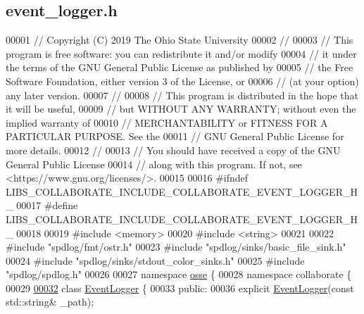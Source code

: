 \hypertarget{event__logger_8h_source}{}\subsection{event\+\_\+logger.\+h}
\label{event__logger_8h_source}

\begin{DoxyCode}
00001 \textcolor{comment}{// Copyright (C) 2019 The Ohio State University}
00002 \textcolor{comment}{//}
00003 \textcolor{comment}{// This program is free software: you can redistribute it and/or modify}
00004 \textcolor{comment}{// it under the terms of the GNU General Public License as published by}
00005 \textcolor{comment}{// the Free Software Foundation, either version 3 of the License, or}
00006 \textcolor{comment}{// (at your option) any later version.}
00007 \textcolor{comment}{//}
00008 \textcolor{comment}{// This program is distributed in the hope that it will be useful,}
00009 \textcolor{comment}{// but WITHOUT ANY WARRANTY; without even the implied warranty of}
00010 \textcolor{comment}{// MERCHANTABILITY or FITNESS FOR A PARTICULAR PURPOSE.  See the}
00011 \textcolor{comment}{// GNU General Public License for more details.}
00012 \textcolor{comment}{//}
00013 \textcolor{comment}{// You should have received a copy of the GNU General Public License}
00014 \textcolor{comment}{// along with this program.  If not, see <https://www.gnu.org/licenses/>.}
00015 
00016 \textcolor{preprocessor}{#ifndef LIBS\_COLLABORATE\_INCLUDE\_COLLABORATE\_EVENT\_LOGGER\_H\_}
00017 \textcolor{preprocessor}{#define LIBS\_COLLABORATE\_INCLUDE\_COLLABORATE\_EVENT\_LOGGER\_H\_}
00018 
00019 \textcolor{preprocessor}{#include <memory>}
00020 \textcolor{preprocessor}{#include <string>}
00021 
00022 \textcolor{preprocessor}{#include "spdlog/fmt/ostr.h"}
00023 \textcolor{preprocessor}{#include "spdlog/sinks/basic\_file\_sink.h"}
00024 \textcolor{preprocessor}{#include "spdlog/sinks/stdout\_color\_sinks.h"}
00025 \textcolor{preprocessor}{#include "spdlog/spdlog.h"}
00026 
00027 \textcolor{keyword}{namespace }\hyperlink{namespaceosse}{osse} \{
00028 \textcolor{keyword}{namespace }collaborate \{
00029 
\hyperlink{classosse_1_1collaborate_1_1_event_logger}{00032} \textcolor{keyword}{class }\hyperlink{classosse_1_1collaborate_1_1_event_logger}{EventLogger} \{
00033  \textcolor{keyword}{public}:
00036   \textcolor{keyword}{explicit} \hyperlink{classosse_1_1collaborate_1_1_event_logger_a9c87908de9f2673fe6464b59df4082d1}{EventLogger}(\textcolor{keyword}{const} std::string& \_path);

\end{DoxyCode}
